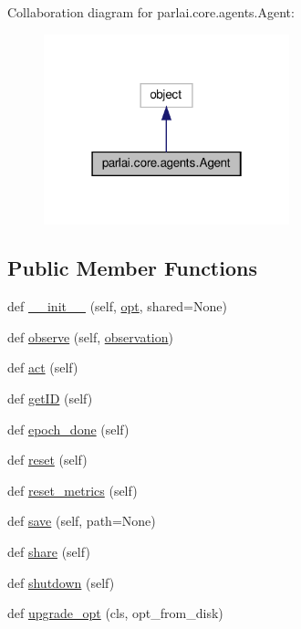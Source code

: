 Collaboration diagram for parlai.\+core.\+agents.\+Agent\+:
\nopagebreak
\begin{figure}[H]
\begin{center}
\leavevmode
\includegraphics[width=202pt]{classparlai_1_1core_1_1agents_1_1Agent__coll__graph}
\end{center}
\end{figure}
\subsection*{Public Member Functions}
\begin{DoxyCompactItemize}
\item 
def \hyperlink{classparlai_1_1core_1_1agents_1_1Agent_aa7992ab392e2803607937e805ceb176f}{\+\_\+\+\_\+init\+\_\+\+\_\+} (self, \hyperlink{classparlai_1_1core_1_1agents_1_1Agent_ab3b45d2754244608c75d4068b90cd051}{opt}, shared=None)
\item 
def \hyperlink{classparlai_1_1core_1_1agents_1_1Agent_a98041e2d186aa81bd5e1649a91f623bc}{observe} (self, \hyperlink{classparlai_1_1core_1_1agents_1_1Agent_aedbecc4b4aa7af7413882a0429e0f1db}{observation})
\item 
def \hyperlink{classparlai_1_1core_1_1agents_1_1Agent_a6a8abe0a98dd59bc39c9f12b163072db}{act} (self)
\item 
def \hyperlink{classparlai_1_1core_1_1agents_1_1Agent_a29e1cdd729ac4236f8bae90b2e66fa04}{get\+ID} (self)
\item 
def \hyperlink{classparlai_1_1core_1_1agents_1_1Agent_a40157e237ea85d75ebc3fd248c7a1a1b}{epoch\+\_\+done} (self)
\item 
def \hyperlink{classparlai_1_1core_1_1agents_1_1Agent_a27cb8206372681605b00dc28b81a7c39}{reset} (self)
\item 
def \hyperlink{classparlai_1_1core_1_1agents_1_1Agent_aaefcbd7c61d319b368b3ee13997c8c99}{reset\+\_\+metrics} (self)
\item 
def \hyperlink{classparlai_1_1core_1_1agents_1_1Agent_a51e706e3e5389c9b48c7a1589d97ec99}{save} (self, path=None)
\item 
def \hyperlink{classparlai_1_1core_1_1agents_1_1Agent_afbbb06bf0f46ff927c8b186726a68b47}{share} (self)
\item 
def \hyperlink{classparlai_1_1core_1_1agents_1_1Agent_a801e5ca2a5e8e96a72f0c04549008e8f}{shutdown} (self)
\item 
def \hyperlink{classparlai_1_1core_1_1agents_1_1Agent_a005f62f977e8a7ebf91b9646307153bc}{upgrade\+\_\+opt} (cls, opt\+\_\+from\+\_\+disk)
\end{DoxyCompactItemize}

